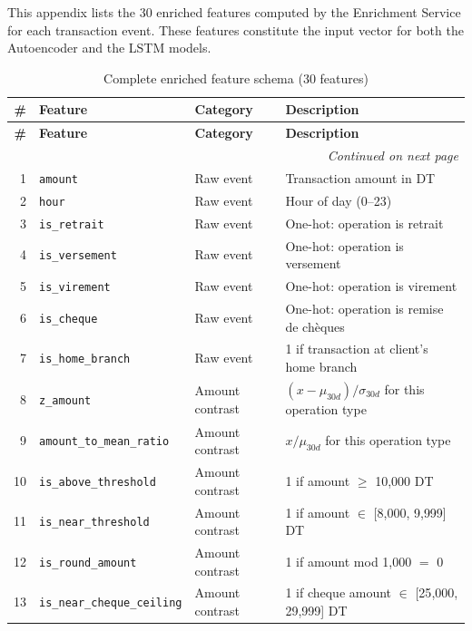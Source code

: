 This appendix lists the 30 enriched features computed by the Enrichment
Service for each transaction event. These features constitute the input
vector for both the Autoencoder and the LSTM models.

\begin{longtable}{@{}rllp{6.5cm}@{}}
\caption{Complete enriched feature schema (30 features)}
\label{tab:full-feature-schema} \\
\toprule
\textbf{\#} & \textbf{Feature} & \textbf{Category} & \textbf{Description} \\
\midrule
\endfirsthead
\toprule
\textbf{\#} & \textbf{Feature} & \textbf{Category} & \textbf{Description} \\
\midrule
\endhead
\midrule
\multicolumn{4}{r}{\textit{Continued on next page}} \\
\endfoot
\bottomrule
\endlastfoot

1  & \texttt{amount}                     & Raw event & Transaction amount in DT \\
2  & \texttt{hour}                       & Raw event & Hour of day (0--23) \\
3  & \texttt{is\_retrait}                & Raw event & One-hot: operation is retrait \\
4  & \texttt{is\_versement}              & Raw event & One-hot: operation is versement \\
5  & \texttt{is\_virement}               & Raw event & One-hot: operation is virement \\
6  & \texttt{is\_cheque}                 & Raw event & One-hot: operation is remise de chèques \\
7  & \texttt{is\_home\_branch}           & Raw event & 1 if transaction at client's home branch \\
\midrule

8  & \texttt{z\_amount}                  & Amount contrast & $(x - \mu_{30d}) / \sigma_{30d}$ for this operation type \\
9  & \texttt{amount\_to\_mean\_ratio}    & Amount contrast & $x / \mu_{30d}$ for this operation type \\
10 & \texttt{is\_above\_threshold}       & Amount contrast & 1 if amount $\geq$ 10{,}000 DT \\
11 & \texttt{is\_near\_threshold}        & Amount contrast & 1 if amount $\in$ [8{,}000, 9{,}999] DT \\
12 & \texttt{is\_round\_amount}          & Amount contrast & 1 if amount mod 1{,}000 $=$ 0 \\
13 & \texttt{is\_near\_cheque\_ceiling}  & Amount contrast & 1 if cheque amount $\in$ [25{,}000, 29{,}999] DT \\
\midrule


\end{longtable}

